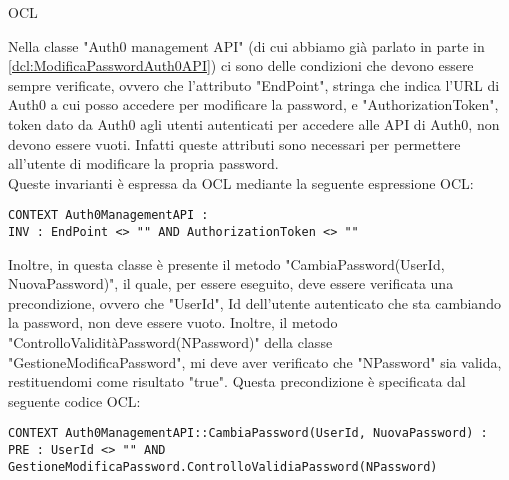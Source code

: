 \begin{listaPersonale}{OCL}
    \begin{center}
        
    \end{center}
    Nella classe "Auth0 management API" (di cui abbiamo già parlato in parte in \ref{dcl:ModificaPasswordAuth0API}) ci sono delle condizioni che devono essere sempre verificate, ovvero che l'attributo "EndPoint", stringa che indica l'URL di Auth0 a cui posso accedere per modificare la password, e "AuthorizationToken", token dato da Auth0 agli utenti autenticati per accedere alle API di Auth0, non devono essere vuoti. Infatti queste attributi sono necessari per permettere all'utente di modificare la propria password.\\
    Queste invarianti è espressa da OCL mediante la seguente espressione OCL:
    \begin{lstlisting}
CONTEXT Auth0ManagementAPI :
INV : EndPoint <> "" AND AuthorizationToken <> ""
    \end{lstlisting}
    Inoltre, in questa classe è presente il metodo "CambiaPassword(UserId, NuovaPassword)", il quale, per essere eseguito, deve essere verificata una precondizione, ovvero che "UserId", Id dell'utente autenticato che sta cambiando la password, non deve essere vuoto. Inoltre, il metodo "ControlloValiditàPassword(NPassword)" della classe "GestioneModificaPassword", mi deve aver verificato che "NPassword" sia valida, restituendomi come risultato "true". Questa precondizione è specificata dal seguente codice OCL:
    \begin{lstlisting}
CONTEXT Auth0ManagementAPI::CambiaPassword(UserId, NuovaPassword) :
PRE : UserId <> "" AND GestioneModificaPassword.ControlloValidiaPassword(NPassword)
    \end{lstlisting}





\end{listaPersonale}
